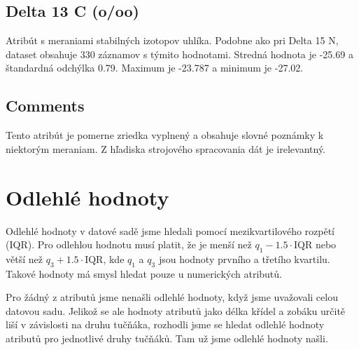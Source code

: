 \documentclass[10pt,xcolor=pdflatex,dvipsnames,table,oneside]{book}
\begin{document}
\subsection*{Delta 13 C (o/oo)}
Atribút s meraniami stabilných izotopov uhlíka. Podobne ako pri Delta 15 N, dataset obsahuje 330 záznamov s týmito hodnotami. Stredná hodnota je -25.69 a štandardná odchýlka 0.79. Maximum je -23.787 a minimum je -27.02.


\subsection*{Comments}
Tento atribút je pomerne zriedka vyplnený a obsahuje slovné poznámky k niektorým meraniam. Z hľadiska strojového spracovania dát je irelevantný.


\section*{Odlehlé hodnoty}
Odlehlé hodnoty v datové sadě jsme hledali pomocí mezikvartilového rozpětí (IQR). Pro odlehlou hodnotu musí platit, že je menší než $q_1 - 1.5 \cdot \textrm{IQR}$ nebo větší než $q_3 + 1.5 \cdot \textrm{IQR}$, kde $q_1$ a $q_3$ jsou hodnoty prvního a třetího kvartilu. Takové hodnoty má smysl hledat pouze u numerických atributů.

Pro žádný z atributů jsme nenašli odlehlé hodnoty, když jsme uvažovali celou datovou sadu. Jelikož se ale hodnoty atributů jako délka křídel a zobáku určitě liší v závislosti na druhu tučňáka, rozhodli jsme se hledat odlehlé hodnoty atributů pro jednotlivé druhy tučňáků.
Tam už jsme odlehlé hodnoty našli.
\end{document}
